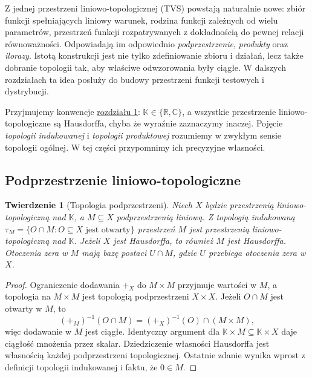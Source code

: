 \documentclass[11pt,a4paper]{article}
\numberwithin{equation}{section}
\theoremstyle{plain}
\newtheorem{twierdzenie}{Twierdzenie}[section]
\theoremstyle{definition}
\theoremstyle{remark}
\newcommand{\R}{\mathbb R}
\newcommand{\C}{\mathbb C}
\newcommand{\K}{\mathbb K}
\begin{document}
Z jednej przestrzeni liniowo-topologicznej (TVS) powstają naturalnie nowe:
zbiór funkcji spełniających liniowy warunek, rodzina funkcji zależnych
od wielu parametrów, przestrzeń funkcji rozpatrywanych z dokładnością
do pewnej relacji równoważności. Odpowiadają im odpowiednio
\emph{podprzestrzenie}, \emph{produkty} oraz \emph{ilorazy}.
Istotą konstrukcji jest nie tylko zdefiniowanie zbioru i działań,
lecz także dobranie topologii tak, aby właściwe odwzorowania były
ciągłe. W dalszych rozdziałach ta idea posłuży do budowy
przestrzeni funkcji testowych i dystrybucji.

Przyjmujemy konwencje \hyperref[sec:tvs]{rozdziału 1}: $\K\in\{\R,\C\}$,
a wszystkie przestrzenie liniowo-topologiczne są Hausdorffa,
chyba że wyraźnie zaznaczymy inaczej. Pojęcie \emph{topologii
indukowanej} i \emph{topologii produktowej} rozumiemy w zwykłym sensie
topologii ogólnej. W tej części przypomnimy ich precyzyjne własności.

\subsection{Podprzestrzenie liniowo-topologiczne}

\begin{twierdzenie}[Topologia podprzestrzeni]\label{thm:subspace-tvs}
Niech $X$ będzie przestrzenią liniowo-topologiczną nad $\K$,
a $M\subseteq X$ podprzestrzenią liniową. Z topologią indukowaną
$\tau_M=\{O\cap M:O\subseteq X\text{ jest otwarty}\}$
przestrzeń $M$ jest przestrzenią liniowo-topologiczną nad $\K$.
Jeżeli $X$ jest Hausdorffa, to również $M$ jest Hausdorffa.
Otoczenia zera w $M$ mają bazę postaci $U\cap M$, gdzie
$U$ przebiega otoczenia zera w $X$.
\end{twierdzenie}
\begin{proof}
Ograniczenie dodawania $+_X$ do $M\times M$ przyjmuje wartości
w $M$, a topologia na $M\times M$ jest topologią podprzestrzeni
$X\times X$. Jeżeli $O\cap M$ jest otwarty w $M$, to
\[
 (+_M)^{-1}(O\cap M)=(+_X)^{-1}(O)\cap(M\times M),
\]
więc dodawanie w $M$ jest ciągłe. Identyczny argument dla
$\K\times M\subseteq\K\times X$ daje ciągłość mnożenia
przez skalar. Dziedziczenie własności Hausdorffa jest własnością
każdej podprzestrzeni topologicznej. Ostatnie zdanie wynika
wprost z definicji topologii indukowanej i faktu, że $0\in M$.
\end{proof}
\end{document}

